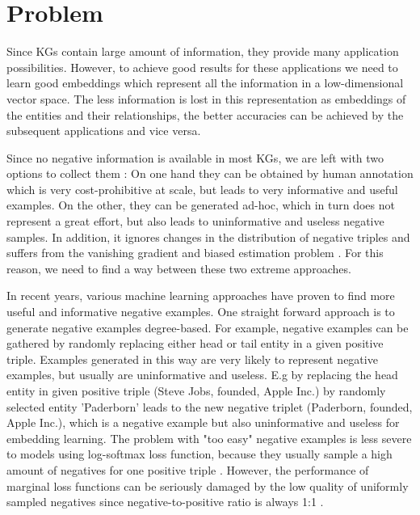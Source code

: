 \chapter{Problem}
\label{ch:problem}

Since \acp{KG} contain large amount of information, they provide many application possibilities.
However, to achieve good results for these applications we need to learn good embeddings which represent all the information in a low-dimensional vector space.
The less information is lost in this representation as embeddings of the entities and their relationships, the better accuracies can be achieved by the subsequent applications and vice versa.

Since no negative information is available in most \acp{KG}, we are left with two options to collect them \cite{safavi2021negater}: 
On one hand they can be obtained by human annotation which is very cost-prohibitive at scale, but leads to very informative and useful examples. 
On the other, they can be generated ad-hoc, which in turn does not represent a great effort, but also leads to uninformative and useless negative samples.
In addition, it ignores changes in the distribution of negative triples and suffers from the vanishing gradient and biased estimation problem \cite{zhang2021efficient}.
For this reason, we need to find a way between these two extreme approaches.

In recent years, various machine learning approaches have proven to find more useful and informative negative examples.
One straight forward approach is to generate negative examples degree-based.
For example, negative examples can be gathered by randomly replacing either head or tail entity in a given positive triple.
Examples generated in this way are very likely to represent negative examples, but usually are uninformative and useless.
E.g by replacing the head entity in given positive triple (Steve Jobs, founded, Apple Inc.) by randomly selected entity 'Paderborn' leads to the new negative triplet (Paderborn, founded, Apple Inc.), which is a negative example but also uninformative and useless for embedding learning.
The problem with "too easy" negative examples is less severe to models using log-softmax loss function, because they usually sample a high amount of negatives for one positive triple \cite{cai2017kbgan}.
However, the performance of marginal loss functions can be seriously damaged by the low quality of uniformly sampled negatives since negative-to-positive ratio is always 1:1 \cite{cai2017kbgan}.

